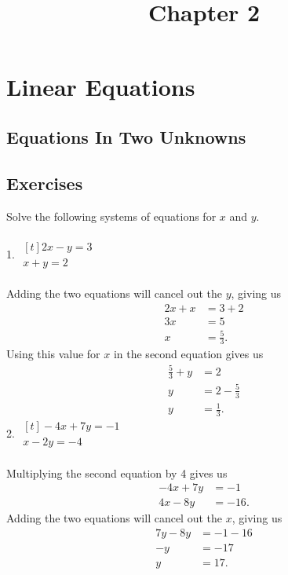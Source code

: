 \documentclass[12pt]{article}
\title{Chapter 2}
\author{}
\date{}
\begin{document}
\maketitle
\newtheorem{theorem}{Theorem}
\newtheorem{corollary}{Corollary}[theorem]

\section{Linear Equations}
\subsection{Equations In Two Unknowns}
\subsection*{Exercises}
Solve the following systems of equations for $x$ and $y$. \\
\\
1. $\begin{aligned}[t]
2x-y=3 \\
x+y=2
\end{aligned}$ \\
\\
Adding the two equations will cancel out the $y$, giving us
\begin{align*}
2x+x&=3+2 \\
3x&=5 \\
x&=\displaystyle \frac{5}{3}.
\end{align*}
Using this value for $x$ in the second equation gives us
\begin{align*}
\displaystyle \frac{5}{3}+y&=2 \\
y&=2-\displaystyle \frac{5}{3} \\
y&=\displaystyle \frac{1}{3}.
\end{align*}
2. $\begin{aligned}[t]
-4x+7y=-1 \\
x-2y=-4
\end{aligned}$ \\
\\
Multiplying the second equation by 4 gives us
\begin{align*}
-4x+7y&=-1 \\
4x-8y&=-16.
\end{align*}
Adding the two equations will cancel out the $x$, giving us
\begin{align*}
7y-8y&=-1-16 \\
-y&=-17 \\
y&=17.
\end{align*}
\end{document}
